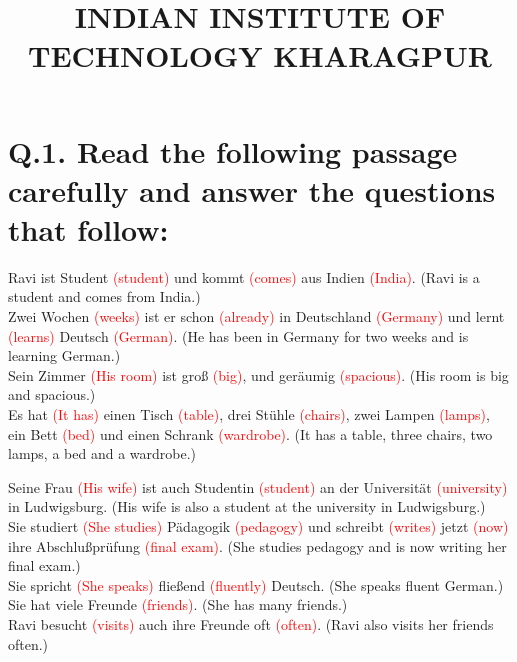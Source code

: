 \documentclass{article}
\title{
INDIAN INSTITUTE OF TECHNOLOGY KHARAGPUR
}
\date{}
\begin{document}
\maketitle

\section*{Q.1. Read the following passage carefully and answer the questions that follow:}

Ravi ist Student \textcolor{red}{(student)} und kommt \textcolor{red}{(comes)} aus Indien \textcolor{red}{(India)}. (Ravi is a student and comes from India.)\\
Zwei Wochen \textcolor{red}{(weeks)} ist er schon \textcolor{red}{(already)} in Deutschland \textcolor{red}{(Germany)} und lernt \textcolor{red}{(learns)} Deutsch \textcolor{red}{(German)}. (He has been in Germany for two weeks and is learning German.)\\
Sein Zimmer \textcolor{red}{(His room)} ist groß \textcolor{red}{(big)}, und geräumig \textcolor{red}{(spacious)}. (His room is big and spacious.)\\
Es hat \textcolor{red}{(It has)} einen Tisch \textcolor{red}{(table)}, drei Stühle \textcolor{red}{(chairs)}, zwei Lampen \textcolor{red}{(lamps)}, ein Bett \textcolor{red}{(bed)} und einen Schrank \textcolor{red}{(wardrobe)}. (It has a table, three chairs, two lamps, a bed and a wardrobe.)

Seine Frau \textcolor{red}{(His wife)} ist auch Studentin \textcolor{red}{(student)} an der Universität \textcolor{red}{(university)} in Ludwigsburg. (His wife is also a student at the university in Ludwigsburg.)\\
Sie studiert \textcolor{red}{(She studies)} Pädagogik \textcolor{red}{(pedagogy)} und schreibt \textcolor{red}{(writes)} jetzt \textcolor{red}{(now)} ihre Abschlußprüfung \textcolor{red}{(final exam)}. (She studies pedagogy and is now writing her final exam.)\\
Sie spricht \textcolor{red}{(She speaks)} fließend \textcolor{red}{(fluently)} Deutsch. (She speaks fluent German.)\\
Sie hat viele Freunde \textcolor{red}{(friends)}. (She has many friends.)\\
Ravi besucht \textcolor{red}{(visits)} auch ihre Freunde oft \textcolor{red}{(often)}. (Ravi also visits her friends often.)
\end{document}
